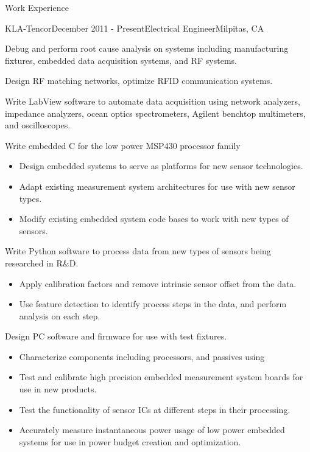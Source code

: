 \documentclass{resume} %
\begin{document}
\begin{rSection}{Work Experience}

\begin{rSubsection}{KLA-Tencor}{December 2011 - Present}{Electrical Engineer}{Milpitas, CA}
\smallskip
\item Debug and perform root cause analysis on systems including manufacturing fixtures, embedded data acquisition systems, and RF systems.
\item Design RF matching networks, optimize RFID communication systems.
\item Write LabView software to automate data acquisition using network analyzers, impedance analyzers, ocean optics spectrometers, Agilent benchtop multimeters, and oscilloscopes.

\item Write embedded C for the low power MSP430 processor family
\begin{itemize}
\itemsep -0.5em \vspace{-0.5em}
\renewcommand{\labelitemi}{-}
\item Design embedded systems to serve as platforms for new sensor technologies.
\item Adapt existing measurement system architectures for use with new sensor types.
\item Modify existing embedded system code bases to work with new types of sensors. 
\end{itemize}

\item Write Python software to process data from new types of sensors being researched in R\&D.
\begin{itemize}
\itemsep -0.5em \vspace{-0.5em}
\renewcommand{\labelitemi}{-}
\item Apply calibration factors and remove intrinsic sensor offset from the data.
\item Use feature detection to identify process steps in the data, and perform analysis on each step.
\end{itemize}

\item Design PC software and firmware for use with test fixtures.
\begin{itemize}
\itemsep -0.5em \vspace{-0.5em}
\renewcommand{\labelitemi}{-}
\item Characterize components including processors, and passives using
\item Test and calibrate high precision embedded measurement system boards for use in new products.
\item Test the functionality of sensor ICs at different steps in their processing.
\item Accurately measure instantaneous power usage of low power embedded systems for use in power budget creation and optimization.
\end{itemize}



\end{rSubsection}
\end{rSection}
\end{document}
